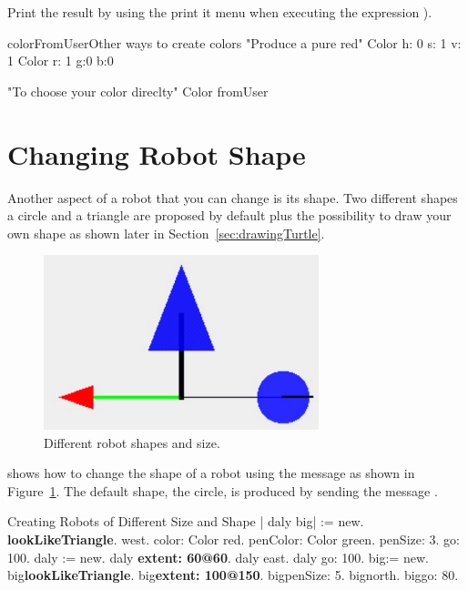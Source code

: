 Print the result by using the print it menu when executing the expression ).

\begin{scriptfig}{colorFromUser}{Other ways to create colors}\label{scr:colorCreation}
"Produce a pure red"
Color h: 0 s: 1 v: 1
Color r: 1 g:0 b:0

"To choose your color direclty"
Color fromUser
\end{scriptfig}



\section{Changing Robot Shape}
Another aspect of a robot that you can change is its shape. Two different shapes a circle and a triangle are proposed by default plus the possibility to draw your own shape as shown later in Section~\ref{sec:drawingTurtle}.

\begin{figure}[h]
\begin{center}
\includegraphics[width=8cm]{shapeAndSize}
\caption{Different robot shapes and size. \label{fig:shapeAndSize}}
\end{center}
\end{figure}

 shows how to change the shape of a robot using the message   as shown in Figure~\ref{fig:shapeAndSize}. The default shape, the circle, is produced by sending the message    . 

\begin{scriptwithtitle}{Creating Robots of Different Size and Shape}\label{scr:differentsize}
| \caro daly  big\caro |
\caro := \Turtle new.
\caro \textbf{lookLikeTriangle}.
\caro west.
\caro color: Color red.
\caro penColor: Color green.
\caro penSize: 3.
\caro go: 100.
daly := \Turtle new.
daly \textbf{extent: 60@60}.
daly east.
daly go: 100.
big\caro := \Turtle new.
big\caro \textbf{lookLikeTriangle}.
big\caro \textbf{extent: 100@150}.
big\caro penSize: 5.
big\caro north.
big\caro go: 80.
\end{scriptwithtitle}


